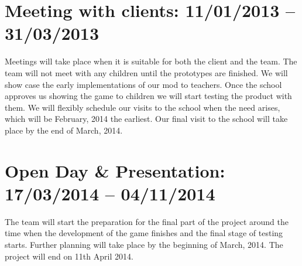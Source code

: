 \section{Meeting with clients: 11/01/2013 -- 31/03/2013}
Meetings will take place when it is suitable for both the client and the team. The team will not meet with any children until the prototypes are finished. We will show case the early implementations of our mod to teachers. Once the school approves us showing the game to children we will start testing the product with them. We will flexibly schedule our visits to the school when the need arises, which will be February, 2014 the earliest. Our final visit to the school will take place by the end of March, 2014.

\section{Open Day \& Presentation: 17/03/2014 -- 04/11/2014}
The team will start the preparation for the final part of the project around the time when the development of the game finishes and the final stage of testing starts. Further planning will take place by the beginning of March, 2014. The project will end on 11th April 2014.

